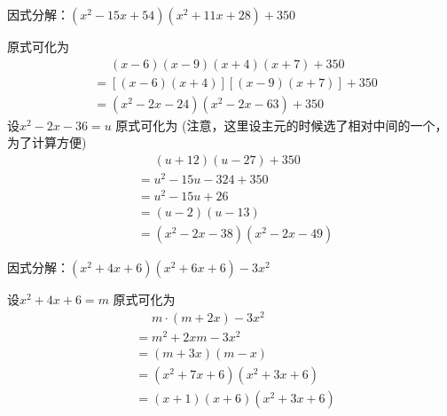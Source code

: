 \documentclass[windows,csize4,answers]{BHCexam}
\begin{document}
\begin{groups}
\begin{questions}[]
        \question[5] 因式分解：$(x^2-15x+54)(x^2+11x+28)+350$
        \begin{solution}{0.5cm}
            \methodonly 原式可化为
            \[
                \begin{aligned}
                     & \phantom{=}(x-6)(x-9)(x+4)(x+7)+350 \\
                     & = [(x-6)(x+4)][(x-9)(x+7)] + 350    \\
                     & = (x^2-2x-24)(x^2-2x-63) +350
                \end{aligned}
            \]
            设$x^2-2x-36=u$ 原式可化为 (注意，这里设主元的时候选了相对中间的一个，为了计算方便)
            \[
                \begin{aligned}
                     & \phantom{=}(u+12)(u-27)+350 \\
                     & = u^2-15u-324 + 350         \\
                     & = u^2-15u+26                \\
                     & = (u-2)(u-13)               \\
                     & = (x^2-2x-38)(x^2-2x-49)
                \end{aligned}
            \]
        \end{solution}
        \vspace{3.5cm}

        \question[5] 因式分解：$(x^2+4x+6)(x^2+6x+6)-3x^2$
        \begin{solution}{0.5cm}
            \methodonly 设$x^2+4x+6=m$ 原式可化为
            \[
                \begin{aligned}
                     & \phantom{=}m\cdot (m+2x) -3x^2 \\
                     & = m^2+2xm-3x^2                 \\
                     & = (m+3x)(m-x)                  \\
                     & = (x^2+7x+6)(x^2+3x+6)         \\
                     & = (x+1)(x+6)(x^2+3x+6)
                \end{aligned}
            \]
        \end{solution}
        \vspace{3.5cm}


\end{questions}
\end{groups}
\end{document}
